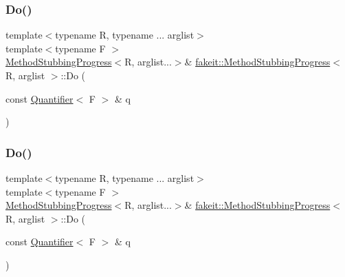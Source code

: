 \mbox{\label{structfakeit_1_1MethodStubbingProgress_a59f9d7ab7c86b809ce25b41d05b58ad2}} 
\subsubsection{\texorpdfstring{Do()}{Do()}\hspace{0.1cm}{\footnotesize\ttfamily [9/27]}}
{\footnotesize\ttfamily template$<$typename R, typename ... arglist$>$ \\
template$<$typename F $>$ \\
\mbox{\hyperlink{structfakeit_1_1MethodStubbingProgress}{Method\+Stubbing\+Progress}}$<$R, arglist...$>$\& \mbox{\hyperlink{structfakeit_1_1MethodStubbingProgress}{fakeit\+::\+Method\+Stubbing\+Progress}}$<$ R, arglist $>$\+::Do (\begin{DoxyParamCaption}\item[{const \mbox{\hyperlink{structfakeit_1_1Quantifier}{Quantifier}}$<$ F $>$ \&}]{q }\end{DoxyParamCaption})\hspace{0.3cm}{\ttfamily [inline]}}

\mbox{\label{structfakeit_1_1MethodStubbingProgress_a59f9d7ab7c86b809ce25b41d05b58ad2}} 
\subsubsection{\texorpdfstring{Do()}{Do()}\hspace{0.1cm}{\footnotesize\ttfamily [10/27]}}
{\footnotesize\ttfamily template$<$typename R, typename ... arglist$>$ \\
template$<$typename F $>$ \\
\mbox{\hyperlink{structfakeit_1_1MethodStubbingProgress}{Method\+Stubbing\+Progress}}$<$R, arglist...$>$\& \mbox{\hyperlink{structfakeit_1_1MethodStubbingProgress}{fakeit\+::\+Method\+Stubbing\+Progress}}$<$ R, arglist $>$\+::Do (\begin{DoxyParamCaption}\item[{const \mbox{\hyperlink{structfakeit_1_1Quantifier}{Quantifier}}$<$ F $>$ \&}]{q }\end{DoxyParamCaption})\hspace{0.3cm}{\ttfamily [inline]}}


